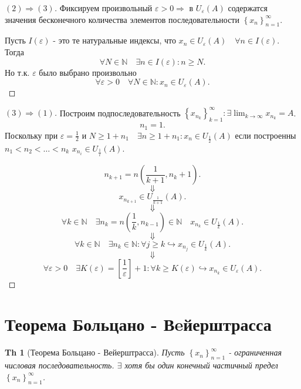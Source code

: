 \documentclass[a5paper, 10pt]{article}
\theoremstyle{plain}
\newtheorem*{theorem_}{Th}
\newcommand{\N}{\mathbb N}
\newcommand{\eps}{\varepsilon}
\newcommand{\hrarrow}{\hookrightarrow}
\newcommand{\Rarrow}{\Rightarrow}
\begin{document}
    \begin{proof}[$ (2) \Rarrow (3) $]
        Фиксируем произвольный $ \eps > 0 \Rarrow $ в $ U_{\eps}(A) $ содержатся
        значения бесконечного количества элементов последовательности
        $ \left\{x_n \right\}_{n = 1}^{\infty} $.

        Пусть $ I(\eps) $ - это те натуральные индексы, что $ x_n \in U_{\eps}(A) \quad
        \forall n \in I(\eps) $. Тогда
        \[
            \forall N \in \N \quad \exists n \in I(\eps): n \geq N
        .\]
        Но т.к. $ \eps $ было выбрано произвольно
        \[
            \forall \eps > 0 \quad \forall N \in \N: x_n \in U_{\eps}(A)
        .\]
    \end{proof}

    \begin{proof}[$ (3) \Rarrow (1) $]
        Построим подпоследовательность $ \left\{ x_{n_k} \right\}_{k = 1}^{\infty} :
        \exists \lim_{k \to \infty} x_{n_k} = A $.
        \[
            n_1 = 1
        .\]
        Поскольку при $ \eps = \frac{1}{2} $ и $ N \geq 1 + n_1 \quad \exists n \geq 1 + n_1:
        x_n \in U_{\frac{1}{2} }(A) $ если построенны $ n_1 < n_2 < \dots < n_k $
        $ x_{n_i} \in U_{\frac{1}{i}}(A) $.

        \[
            n_{k + 1} = n\left(\frac{1}{k + 1}, n_k + 1\right).
        \] \[ \Downarrow \] \[
            x_{n_{k+1}} \in U_{\frac{1}{k+1}}(A).
        \] \[ \Downarrow \] \[
            \forall k \in \N \quad \exists n_k = n\left(\frac{1}{k}, n_{k-1}\right) \in \N \quad
            x_{n_k} \in U_{\frac{1}{k}}(A).
        \] \[ \Downarrow \] \[
            \forall k \in \N \quad \exists n_k \in \N:
            \forall j \geq k \hrarrow x_{n_j} \in U_{\frac{1}{k}}(A).
        \] \[ \Downarrow \] \[
            \forall \eps > 0 \quad \exists K(\eps) = \left[ \frac{1}{\eps} \right] + 1:
            \forall k \geq K(\eps) \hrarrow x_{n_k} \in U_{\eps}(A).
        \]
    \end{proof}

    \section{Теорема Больцано - Вeйерштрасса}

    \begin{theorem_}[Теорема Больцано - Вейерштрасса]
        Пусть $ \left\{x_n \right\}_{n = 1}^{\infty} $ - ограниченная числовая последовательность.
        $ \exists $ хотя бы один конечный частичный предел
        $ \left\{x_n \right\}_{n = 1}^{\infty} $.
    \end{theorem_}
\end{document}

